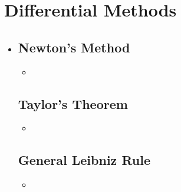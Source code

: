 \section{Differential Methods}
\begin{itemize}
  \item []

  \subsection{Newton's Method}
  \begin{itemize}
    \item
  \end{itemize}

  \subsection{Taylor's Theorem}
  \begin{itemize}
    \item
  \end{itemize}

  \subsection{General Leibniz Rule}
  \begin{itemize}
    \item
  \end{itemize}

\end{itemize}
